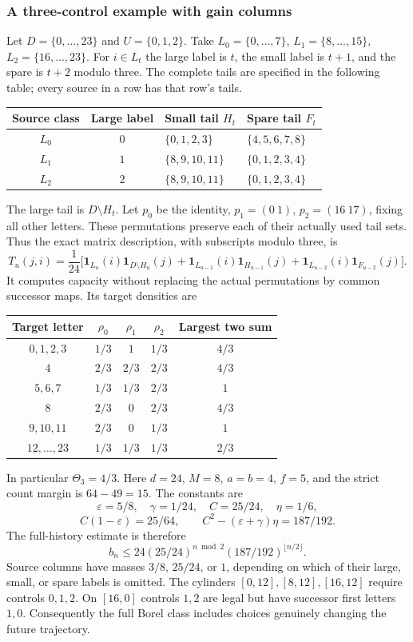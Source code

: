\documentclass[11pt,reqno]{amsart}
\numberwithin{equation}{section}
\theoremstyle{definition}
\newcommand{\one}{\mathbf 1}
\newcommand{\eps}{\varepsilon}
\begin{document}
\subsubsection{A three-control example with gain columns}
Let $D=\{0,\ldots,23\}$ and $U=\{0,1,2\}$.
Take $L_0=\{0,\ldots,7\}$, $L_1=\{8,\ldots,15\}$,
$L_2=\{16,\ldots,23\}$. For $i\in L_t$ the large label is
$t$, the small label is $t+1$, and the spare is $t+2$ modulo three.
The complete tails are specified in the following table; every
source in a row has that row's tails.
\begin{center}
\begin{tabular}{ccll}
\toprule
Source class&Large label&Small tail $H_t$&Spare tail $F_t$\\
\midrule
$L_0$&$0$&$\{0,1,2,3\}$&$\{4,5,6,7,8\}$\\
$L_1$&$1$&$\{8,9,10,11\}$&$\{0,1,2,3,4\}$\\
$L_2$&$2$&$\{8,9,10,11\}$&$\{0,1,2,3,4\}$\\
\bottomrule
\end{tabular}
\end{center}
The large tail is $D\setminus H_t$. Let $p_0$ be the identity,
$p_1=(0\ 1)$, $p_2=(16\ 17)$, fixing all other letters.
These permutations preserve each of their actually used tail sets.
Thus the exact matrix description, with subscripts modulo three, is
\[
 T_u(j,i)=\frac1{24}\big[
 \one_{L_u}(i)\one_{D\setminus H_u}(j)+
 \one_{L_{u-1}}(i)\one_{H_{u-1}}(j)+
 \one_{L_{u-2}}(i)\one_{F_{u-2}}(j)\big].
\]
It computes capacity without replacing the actual permutations by
common successor maps. Its target densities are
\begin{center}
\begin{tabular}{c|ccc|c}
\toprule
Target letter&$\rho_0$&$\rho_1$&$\rho_2$&Largest two sum\\
\midrule
$0,1,2,3$&$1/3$&$1$&$1/3$&$4/3$\\
$4$&$2/3$&$2/3$&$2/3$&$4/3$\\
$5,6,7$&$1/3$&$1/3$&$2/3$&$1$\\
$8$&$2/3$&$0$&$2/3$&$4/3$\\
$9,10,11$&$2/3$&$0$&$1/3$&$1$\\
$12,\ldots,23$&$1/3$&$1/3$&$1/3$&$2/3$\\
\bottomrule
\end{tabular}
\end{center}
In particular $\Theta_3=4/3$. Here $d=24$, $M=8$, $a=b=4$,
$f=5$, and the strict count margin is $64-49=15$.
The constants are
\[
 \eps=5/8,\quad\gamma=1/24,\quad C=25/24,\quad\eta=1/6,
\]
\[
 C(1-\eps)=25/64,\qquad
 C^2-(\eps+\gamma)\eta=187/192.
\]
The full-history estimate is therefore
\begin{equation}\label{eq:gain-example}
 b_n\le24(25/24)^{n\bmod2}(187/192)^{\lfloor n/2\rfloor}.
\end{equation}
Source columns have masses $3/8$, $25/24$, or $1$, depending
on which of their large, small, or spare labels is omitted.
The cylinders $[0,12],[8,12],[16,12]$ require controls
$0,1,2$. On $[16,0]$ controls $1,2$ are legal but have successor
first letters $1,0$. Consequently the full Borel class includes
choices genuinely changing the future trajectory.
\end{document}
